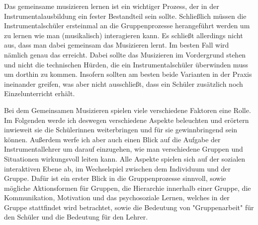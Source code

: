 
Das gemeinsame musizieren lernen ist ein wichtiger Prozess, der in der
Instrumentalausbildung ein fester Bestandteil sein sollte. Schließlich müssen
die Instrumentalschüler ersteinmal an die Gruppenprozesse herangeführt werden um
zu lernen wie man (musikalisch) interagieren kann. Es schließt allerdings nicht
aus, dass man dabei gemeinsam das Musizieren lernt. Im besten Fall wird nämlich
genau das erreicht. Dabei sollte das Musizieren im Vordergrund stehen und nicht
die technischen Hürden, die ein Instrumentalschüler überwinden muss um dorthin
zu kommen. Insofern sollten am
besten beide Varianten in der Praxis ineinander greifen, was aber nicht
ausschließt, dass ein Schüler zusätzlich noch Einzelunterricht erhält.

Bei dem Gemeinsamen Musizieren spielen viele verschiedene Faktoren eine Rolle.
Im Folgenden werde ich deswegen verschiedene Aspekte beleuchten und erörtern
inwieweit sie die Schülerinnen weiterbringen und für sie gewinnbringend sein
können. Außerdem werfe ich aber auch einen Blick auf die Aufgabe der
Instrumentallehrer um darauf einzugehen, wie man verschiedene Gruppen und
Situationen wirkungsvoll leiten kann. Alle Aspekte spielen sich auf der sozialen
interaktiven Ebene ab, im Wechselspiel zwischen dem Individuum und der Gruppe.
Dafür ist ein erster Blick in die Gruppenprozesse sinnvoll, sowie mögliche
Aktionsformen für Gruppen, die Hierarchie innerhalb einer Gruppe, die
Kommunikation, Motivation und das psychosoziale Lernen, welches in der Gruppe
stattfindet wird betrachtet, sowie die Bedeutung von "Gruppenarbeit" für den
Schüler und die Bedeutung für den Lehrer.






























